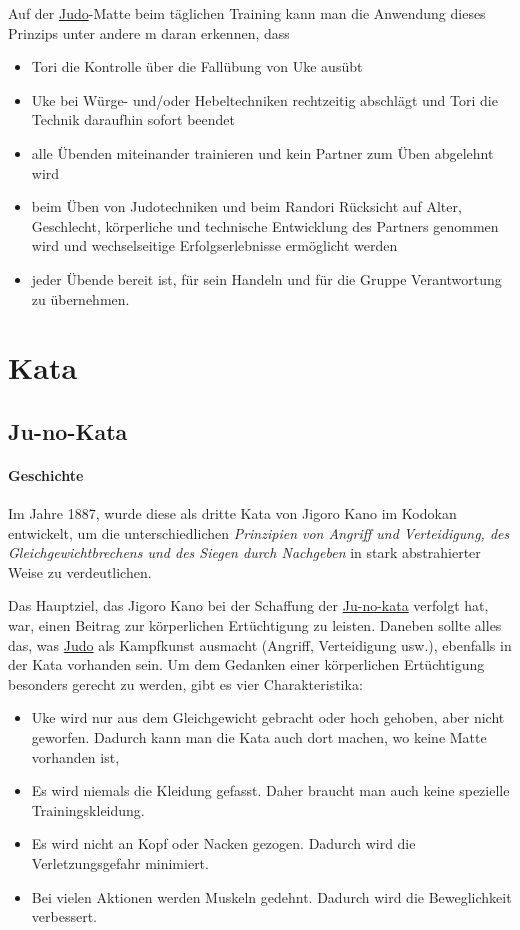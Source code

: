 \documentclass[justified, a4paper, notitlepage, captions=tableheading, nobib]{tufte-handout}
\begin{document}
Auf der \hyperref[org6f56467]{Judo}-Matte beim täglichen Training kann man die Anwendung dieses Prinzips unter andere
m daran erkennen, dass 
\begin{itemize}
\item Tori die Kontrolle über die Fallübung von Uke ausübt
\item Uke bei Würge- und/oder Hebeltechniken rechtzeitig abschlägt und Tori die Technik daraufhin sofort beendet
\item alle Übenden miteinander trainieren und kein Partner zum Üben abgelehnt wird
\item beim Üben von Judotechniken und beim Randori Rücksicht auf Alter, Geschlecht, körperliche und technische  Entwicklung des Partners genommen wird und wechselseitige Erfolgserlebnisse ermöglicht werden
\item jeder Übende bereit ist, für sein Handeln und für die Gruppe Verantwortung zu übernehmen.
\end{itemize}


\newpage
\section{Kata }
\label{sec:org49e139e}
\subsection{\label{orgde09d8a}Ju-no-Kata}
\label{sec:org013d3b1}
\paragraph{Geschichte}
\label{sec:org98055eb}
Im Jahre 1887, wurde diese als dritte Kata von Jigoro Kano im Kodokan entwickelt, um die unterschiedlichen \emph{Prinzipien von Angriff und Verteidigung, des Gleichgewichtbrechens und des Siegen durch Nachgeben} in stark abstrahierter Weise zu verdeutlichen. 

Das Hauptziel, das Jigoro Kano bei der Schaffung der \hyperref[orgde09d8a]{Ju-no-kata} verfolgt hat, war, einen Beitrag zur körperlichen Ertüchtigung zu leisten. 
Daneben sollte alles das, was \hyperref[org6f56467]{Judo} als Kampfkunst ausmacht (Angriff, Verteidigung usw.), ebenfalls in der Kata vorhanden sein. 
Um dem Gedanken einer körperlichen Ertüchtigung besonders gerecht zu werden, gibt es vier Charakteristika:

\begin{itemize}
\item Uke wird nur aus dem Gleichgewicht gebracht oder hoch gehoben, aber nicht geworfen. Dadurch kann man die Kata auch dort machen, wo keine Matte vorhanden ist,
\item Es wird niemals die Kleidung gefasst. Daher braucht man auch keine spezielle Trainingskleidung.
\item Es wird nicht an Kopf oder Nacken gezogen. Dadurch wird die Verletzungsgefahr minimiert.
\item Bei vielen Aktionen werden Muskeln gedehnt. Dadurch wird die Beweglichkeit verbessert.
\end{itemize}
\end{document}
